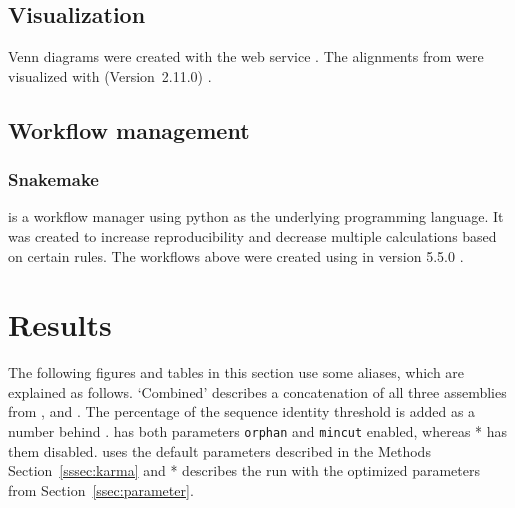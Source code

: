 \documentclass[12pt,a4paper,english]{article}
\begin{document}
\subsection{Visualization}
Venn diagrams were created with the \intervene web service \citep{intervene:17}. The alignments from \muscle were visualized with \jalview (Version~2.11.0) \citep{jalview:09}.

\subsection{Workflow management}
\subsubsection*{Snakemake}
    \snakemake is a workflow manager using python as the underlying programming language. It was created to increase reproducibility and decrease multiple calculations based on certain rules. The workflows above were created using \snakemake in version 5.5.0 \citep{Snakemake:12}.


\newpage
\section{Results}
	\label{sec:results}
	
	The following figures and tables in this section use some aliases, which are explained as follows. `Combined' describes a concatenation of all three assemblies from \spades, \soap and \trinity. The percentage of the sequence identity threshold is added as a number behind \cdhit. \grouper has both parameters \texttt{orphan} and \texttt{mincut} enabled, whereas \grouper{}* has them disabled.
	\karma uses the default parameters described in the Methods Section~\ref{sssec:karma} and \karma{}* describes the run with the optimized parameters from Section~\ref{ssec:parameter}.
	
\end{document}
